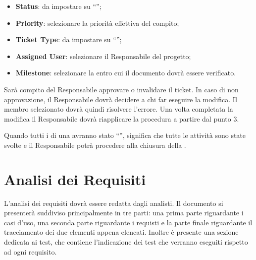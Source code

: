 \begin{enumerate}
\begin{itemize}
\item \textbf{Status}: da impostare su ``'';
\item \textbf{Priority}: selezionare la priorità effettiva del compito;
\item \textbf{Ticket Type}: da impostare su ``'';
\item \textbf{Assigned User}: selezionare il Responsabile del progetto;
\item \textbf{Milestone}: selezionare la  entro cui il documento dovrà essere verificato.
\end{itemize}
Sarà  compito del Responsabile approvare o invalidare il ticket. In caso di non approvazione, il Responsabile dovrà decidere a chi far eseguire la modifica. Il membro selezionato dovrà quindi risolvere l'errore. Una volta completata la modifica il Responsabile dovrà riapplicare la procedura a partire dal punto 3.
\end{enumerate}
Quando tutti i  di una  avranno stato ``'', significa che tutte le attività sono state svolte e il Responsabile potrà procedere alla chiusura della .

\clearpage
\section{Analisi dei Requisiti}
L'analisi dei requisiti dovrà essere redatta dagli analisti. Il documento si presenterà suddiviso principalmente in tre parti: una prima parte riguardante i casi d'uso, una seconda parte riguardante i requisti e la parte finale riguardante il tracciamento dei due elementi appena elencati.
Inoltre è presente una sezione dedicata ai test, che contiene l'indicazione dei test che verranno eseguiti rispetto ad ogni requisito.

